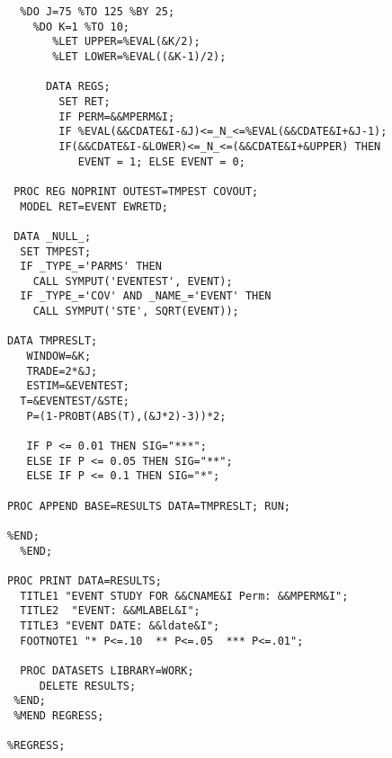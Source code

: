 \begin{singlespace}
\begin{scriptsize}
\begin{verbatim}
  %DO J=75 %TO 125 %BY 25;
    %DO K=1 %TO 10;
       %LET UPPER=%EVAL(&K/2);
       %LET LOWER=%EVAL((&K-1)/2);

      DATA REGS;
        SET RET;
        IF PERM=&&MPERM&I;
        IF %EVAL(&&CDATE&I-&J)<=_N_<=%EVAL(&&CDATE&I+&J-1);
        IF(&&CDATE&I-&LOWER)<=_N_<=(&&CDATE&I+&UPPER) THEN
           EVENT = 1; ELSE EVENT = 0;

 PROC REG NOPRINT OUTEST=TMPEST COVOUT;
  MODEL RET=EVENT EWRETD;

 DATA _NULL_;
  SET TMPEST;
  IF _TYPE_='PARMS' THEN
    CALL SYMPUT('EVENTEST', EVENT);
  IF _TYPE_='COV' AND _NAME_='EVENT' THEN
    CALL SYMPUT('STE', SQRT(EVENT));

DATA TMPRESLT;
   WINDOW=&K;
   TRADE=2*&J;
   ESTIM=&EVENTEST;
  T=&EVENTEST/&STE;
   P=(1-PROBT(ABS(T),(&J*2)-3))*2;

   IF P <= 0.01 THEN SIG="***";
   ELSE IF P <= 0.05 THEN SIG="**";
   ELSE IF P <= 0.1 THEN SIG="*";

PROC APPEND BASE=RESULTS DATA=TMPRESLT; RUN;

%END;
  %END;

PROC PRINT DATA=RESULTS;
  TITLE1 "EVENT STUDY FOR &&CNAME&I Perm: &&MPERM&I";
  TITLE2  "EVENT: &&MLABEL&I";
  TITLE3 "EVENT DATE: &&ldate&I";
  FOOTNOTE1 "* P<=.10  ** P<=.05  *** P<=.01";

  PROC DATASETS LIBRARY=WORK;
     DELETE RESULTS;
 %END;
 %MEND REGRESS;

%REGRESS;
\end{verbatim}
\end{scriptsize}
\end{singlespace}
